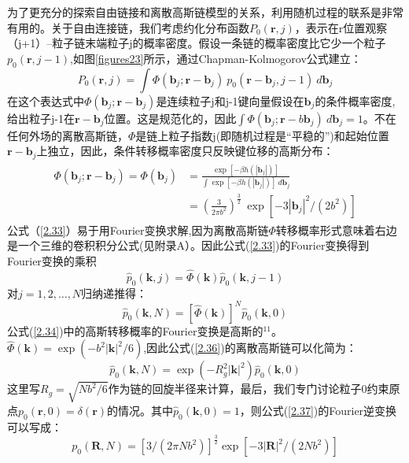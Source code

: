 为了更充分的探索自由链接和离散高斯链模型的关系，利用随机过程的联系是非常有用的。关于自由连接链，我们考虑约化分布函数$P_{0}(\mathbf{r},j)$，表示在r位置观察（j+1）--粒子链末端粒子j的概率密度。假设一条链的概率密度比它少一个粒子$p_{0}(\mathbf{r},j-1)$,如图\ref{figures23}所示，通过Chapman-Kolmogorov公式建立：
\begin{equation}\label{2.33}
P_{0}(\mathbf{r},j)=\int  \varPhi (\mathbf{b}_{j};\mathbf{r}-\mathbf{b}_{j})~p_{0}(\mathbf{r}-\mathbf{b}_{j},j-1)~d\mathbf{b}_{j}
\end{equation}
在这个表达式中$\varPhi (\mathbf{b}_{j};\mathbf{r}-\mathbf{b}_{j})$是连续粒子j和j-1键向量假设在$\mathbf{b}_{j}$的条件概率密度,给出粒子j-1在$\mathbf{r}-\mathbf{b}_{j}$位置。这是规范化的，因此$\int  \varPhi (\mathbf{b}_{j};\mathbf{r}-b\mathbf{b}_{j})~d\mathbf{b}_{j}=1$。不在任何外场的离散高斯链，$\varPhi$是链上粒子指数j(即随机过程是“平稳的”)和起始位置$\mathbf{r}-\mathbf{b}_{j}$上独立，因此，条件转移概率密度只反映键位移的高斯分布：
\begin{equation}\label{2.34}
\begin{split}
\begin{aligned}
\varPhi(\mathbf{b}_{j};\mathbf{r}-\mathbf{b}_{j})=\varPhi(\mathbf{b}_{j})&=\frac{\exp[-\beta h(|\mathbf{b}_{j}|)]}{\int \exp[-\beta h(|\mathbf{b}_{j}|)]~d\mathbf{b}_{j}} \\ &=(\frac{3}{2 \pi b^2})^{\frac{3}{2}}~\exp[-3|\mathbf{b}_{j}|^2 / (2b^2)]
\end{aligned}
\end{split}
\end{equation}
公式（\ref{2.33}）易于用Fourier变换求解,因为离散高斯链$\varPhi$转移概率形式意味着右边是一个三维的卷积积分公式(见附录A）。因此公式(\ref{2.33})的Fourier变换得到Fourier变换的乘积
\begin{equation}\label{2.35}
\hat{p}_{0}(\mathbf{k},j)=\hat{\varPhi}(\mathbf{k})\hat{p}_{0}(\mathbf{k},j-1)
\end{equation}
对$j=1,2,\dots ,N$归纳递推得：
\begin{equation}\label{2.36}
\hat{p}_{0}(\mathbf{k},N)=[\hat{\varPhi}(\mathbf{k})]^N\hat{p}_{0}(\mathbf{k},0)
\end{equation}
公式(\ref{2.34})中的高斯转移概率的Fourier变换是高斯的$^{11}$。$\hat{\varPhi}(\mathbf{k})=\exp(-b^2|\mathbf{k}|^2/6)$,因此公式(\ref{2.36})的离散高斯链可以化简为：
\begin{equation}\label{2.37}
\hat{p}_{0}(\mathbf{k},N)=\exp(-R_{g}^2|\mathbf{k}|^2)\hat{p}_{0}(\mathbf{k},0)
\end{equation}
这里写$R_{g}=\sqrt{Nb^2/6}$作为链的回旋半径来计算，最后，我们专门讨论粒子0约束原点$p_{0}(\mathbf{r},0)=\delta(\mathbf{r})$的情况。其中$\hat{p}_{0}(\mathbf{k},0)=1$，则公式(\ref{2.37})的Fourier逆变换可以写成：
\begin{equation}\label{2.38}
p_{0}(\mathbf{R},N)=[3/(2\pi Nb^2)]^\frac{3}{2}\exp[-3|\mathbf{R}|^2/(2Nb^2)]
\end{equation}


